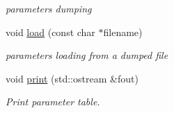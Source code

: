 \begin{DoxyCompactItemize}
\begin{DoxyCompactList}\small\item\em parameters dumping \end{DoxyCompactList}\item 
void \hyperlink{classARC_1_1chainpars_ab0fce7efd7c43dffb1677a5bfb81ab93}{load} (const char $\ast$filename)
\begin{DoxyCompactList}\small\item\em parameters loading from a dumped file \end{DoxyCompactList}\item 
void \hyperlink{classARC_1_1chainpars_a0bd63efbb21ff851fc4632c43df544e5}{print} (std\+::ostream \&fout)
\begin{DoxyCompactList}\small\item\em Print parameter table. \end{DoxyCompactList}\end{DoxyCompactItemize}
